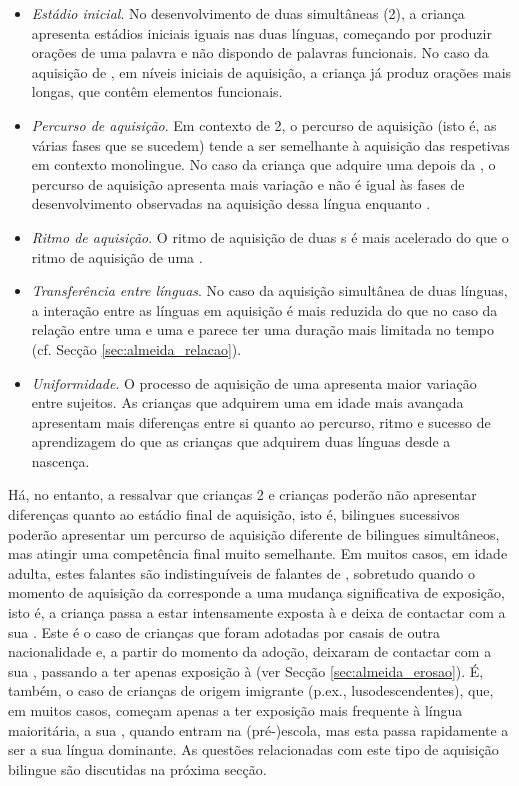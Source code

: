 \documentclass[output=paper]{LSP/langsci}
\begin{document}
\begin{itemize}
\item \textit{Estádio inicial}. No desenvolvimento de duas  simultâneas (2), a criança apresenta estádios iniciais iguais nas duas línguas, começando por produzir orações de uma palavra e não dispondo de palavras funcionais. No caso da aquisição de , em níveis iniciais de aquisição, a criança já produz orações mais longas, que contêm elementos funcionais. 
\item \textit{Percurso de aquisição}. Em contexto de 2, o percurso de aquisição (isto é, as várias fases que se sucedem) tende a ser semelhante à aquisição das respetivas  em contexto monolingue. No caso da criança que adquire uma  depois da , o percurso de aquisição apresenta mais variação e não é igual às fases de desenvolvimento observadas na aquisição dessa língua enquanto .
\item \textit{Ritmo de aquisição}. O ritmo de aquisição de duas s é mais acelerado do que o ritmo de aquisição de uma .
\item \textit{Transferência entre línguas}. No caso da aquisição simultânea de duas línguas, a interação entre as línguas em aquisição é mais reduzida do que no caso da relação entre uma  e uma  e parece ter uma duração mais limitada no tempo (cf. Secção \ref{sec:almeida_relacao}).
\item \textit{Uniformidade}. O processo de aquisição de uma  apresenta maior variação entre sujeitos. As crianças que adquirem uma  em idade mais avançada apresentam mais diferenças entre si quanto ao percurso, ritmo e sucesso de aprendizagem do que as crianças que adquirem duas línguas desde a nascença.
\end{itemize}

Há, no entanto, a ressalvar que crianças 2 e crianças  poderão não apresentar diferenças quanto ao estádio final de aquisição, isto é, bilingues sucessivos poderão apresentar um percurso de aquisição diferente de bilingues simultâneos, mas atingir uma competência final muito semelhante. Em muitos casos, em idade adulta, estes falantes são indistinguíveis de falantes de , sobretudo quando o momento de aquisição da  corresponde a uma mudança significativa de exposição, isto é, a criança passa a estar intensamente exposta à  e deixa de contactar com a sua . Este é o caso de crianças que foram adotadas por casais de outra nacionalidade e, a partir do momento da adoção, deixaram de contactar com a sua , passando a ter apenas exposição à  (ver Secção \ref{sec:almeida_erosao}). É, também, o caso de crianças de origem imigrante (p.ex., lusodescendentes), que, em muitos casos, começam apenas a ter exposição mais frequente à língua maioritária, a sua , quando entram na (pré-)escola, mas esta passa rapidamente a ser a sua língua dominante. As questões relacionadas com este tipo de aquisição bilingue são discutidas na próxima secção.
\end{document}
